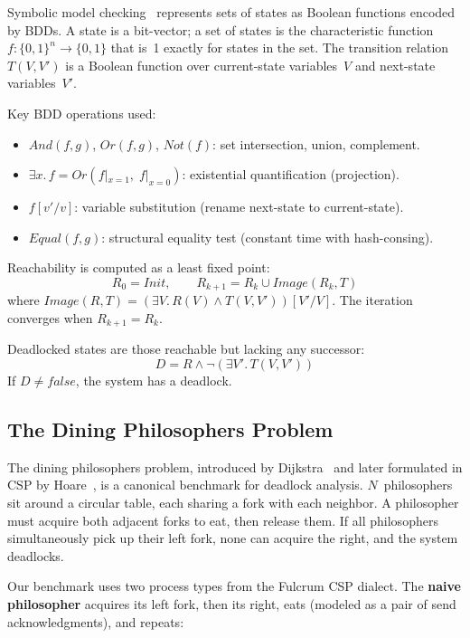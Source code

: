 \documentclass[11pt]{article}
\begin{document}
Symbolic model checking~\cite{McMillan93,Bryant86,ClarkeGrumberg99} represents sets of
states as Boolean functions encoded by BDDs.  A state is a bit-vector;
a set of states is the characteristic function
$f : \{0,1\}^n \to \{0,1\}$ that is~1 exactly for states in the set.
The transition relation $T(V, V')$ is a Boolean function over current-state
variables~$V$ and next-state variables~$V'$.

Key BDD operations used:
\begin{itemize}
\item $\mathit{And}(f, g)$, $\mathit{Or}(f, g)$, $\mathit{Not}(f)$:
      set intersection, union, complement.
\item $\exists x.\, f = \mathit{Or}(f|_{x=1},\; f|_{x=0})$:
      existential quantification (projection).
\item $f[v'/v]$: variable substitution (rename next-state to current-state).
\item $\mathit{Equal}(f, g)$: structural equality test (constant time
      with hash-consing).
\end{itemize}

Reachability is computed as a least fixed point:
\[
  R_0 = \mathit{Init}, \qquad
  R_{k+1} = R_k \cup \mathit{Image}(R_k, T)
\]
where $\mathit{Image}(R, T) = (\exists V.\, R(V) \wedge T(V, V'))[V'/V]$.
The iteration converges when $R_{k+1} = R_k$.

Deadlocked states are those reachable but lacking any successor:
\[
  D = R \wedge \neg (\exists V'.\, T(V, V'))
\]
If $D \neq \mathit{false}$, the system has a deadlock.

\subsection{The Dining Philosophers Problem}

The dining philosophers problem, introduced by Dijkstra~\cite{Dijkstra71}
and later formulated in CSP by Hoare~\cite{Hoare85}, is a canonical
benchmark for deadlock analysis.  $N$~philosophers sit around a circular
table, each sharing a fork with each neighbor.  A philosopher must
acquire both adjacent forks to eat, then release them.  If all
philosophers simultaneously pick up their left fork, none can acquire
the right, and the system deadlocks.

Our benchmark uses two process types from the Fulcrum CSP dialect.
The \textbf{naive philosopher} acquires its left fork, then its right,
eats (modeled as a pair of send acknowledgments), and repeats:
\end{document}
